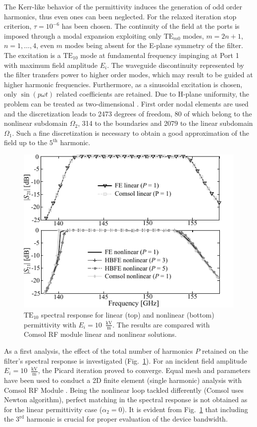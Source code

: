 The Kerr-like behavior of the permittivity induces the generation of odd order harmonics, thus 
even ones can been neglected. For the relaxed
iteration stop criterion, $\tau = 10^{-6}$ has been chosen.
The continuity of the field at the ports is imposed through a modal expansion 
exploiting only $\mathrm{TE}_{m0}$ modes, $m = 2n+1$, $n=1,\ldots,4$, even $m$
modes being absent for the E-plane symmetry of the filter.  
The excitation is a $\mathrm{TE}_{10}$ mode at fundamental frequency impinging at
Port 1 with maximum field amplitude $E_ i$. The 
waveguide discontinuity represented by the filter transfers power to higher order
modes, which may result to be guided at higher harmonic frequencies.
Furthermore, as a sinusoidal excitation is chosen, only $\sin(p \omega t)$ 
related coefficients are retained.
Due to H-plane uniformity, the problem can be treated as two-dimensional \cite{pelosi2009quick}.
First order nodal elements are used and the discretization leads to 2473
degrees of freedom, 80 of which belong to the nonlinear subdomain $\Omega_2$, 
314 to the boundaries and 2079 to the linear subdomain $\Omega_1$. Such a fine
discretization is necessary to obtain a good approximation of the field up to 
the $5^\mathrm{th}$ harmonic.
%
\begin{figure}[!ht]
\centering
\includegraphics[width=12cm]{spectrumNHarm}
\caption{$\mathrm{TE}_{10}$ spectral response for linear (top) and nonlinear 
(bottom) permittivity with $E_i = 10$~$\frac{\mathrm{kV}}{\mathrm{m}}$. The results are compared with Comsol
RF module linear and nonlinear solutions.}
\label{fig:spectrumNHarm}
\end{figure}

As a first analysis, the effect of the total number of harmonics $P$
retained on the filter's spectral response is investigated
(Fig.~\ref{fig:spectrumNHarm}). For an incident field amplitude $E_i = 10$~${\frac{\mathrm{kV}}{\mathrm{m}}}$, the Picard iteration proved to converge. Equal mesh and parameters have been used to conduct a \mbox{2D} finite element (single harmonic) analysis with Comsol RF Module \cite{ComsolRF}. Being the nonlinear loop tackled differently (Comsol uses Newton algorithm), perfect matching in the spectral response is not obtained as for the linear permittivity case ($\alpha_2 = 0$).
It is evident from Fig.~\ref{fig:spectrumNHarm} that including 
the $3^\mathrm{rd}$ harmonic is crucial for proper evaluation of the device
bandwidth.


